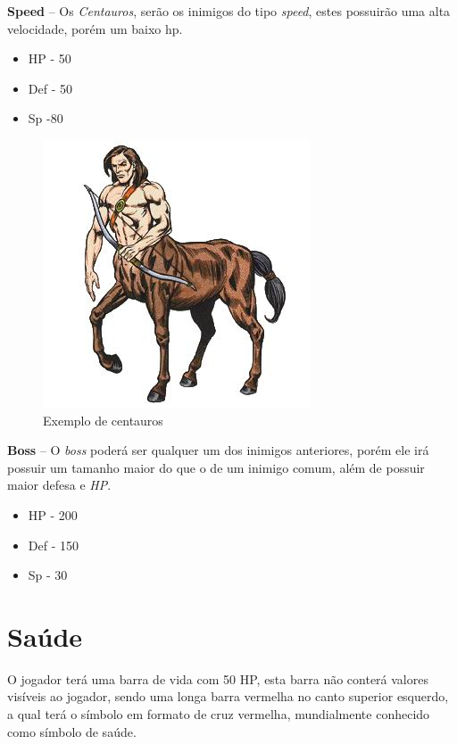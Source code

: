 \documentclass[11pt]{article} %
\begin{document}
\textbf{{\large Speed}} – Os \textit{Centauros}, serão os inimigos do tipo \textit{speed}, estes possuirão uma alta velocidade, porém um baixo hp.
\begin{itemize}
\item HP - 50
\item Def - 50
\item Sp -80
\end{itemize}

\begin{figure}[!htp]
\centering
\includegraphics[scale=0.6]{res/characters/centauro.jpg}
\caption{Exemplo de centauros}
\label{cyclops}
\end{figure}

\textbf{{\large Boss}} – O \textit{boss} poderá ser qualquer um dos inimigos anteriores, porém ele irá possuir um tamanho maior do que o de um inimigo comum, além de possuir maior defesa e \textit{HP}.
\begin{itemize}
\item HP - 200
\item Def - 150
\item Sp - 30
\end{itemize}

\newpage

\section{Saúde}

O jogador terá uma barra de vida com 50 HP, esta barra não conterá valores visíveis ao jogador, sendo uma longa barra vermelha no canto superior esquerdo, a qual terá o símbolo em formato de cruz vermelha, mundialmente conhecido como símbolo de saúde.
\end{document}
